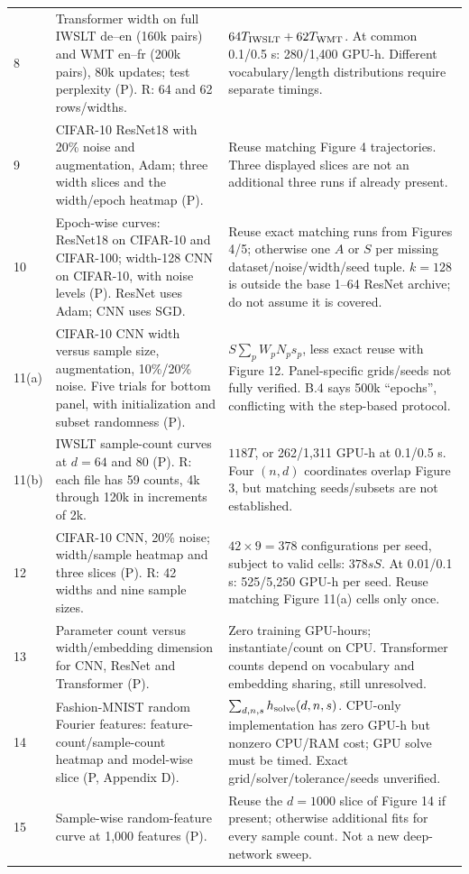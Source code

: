 \documentclass{article}
\begin{document}
\begin{longtable}{@{}P{0.32in}P{3.47in}P{2.9in}@{}}
8 & Transformer width on full IWSLT de--en (160k pairs) and WMT en--fr (200k pairs), 80k updates; test perplexity (P). R: 64 and 62 rows/widths. & $64T_{\rm IWSLT}+62T_{\rm WMT}$. At common 0.1/0.5 s: 280/1,400 GPU-h. Different vocabulary/length distributions require separate timings.\\
9 & CIFAR-10 ResNet18 with 20\% noise and augmentation, Adam; three width slices and the width/epoch heatmap (P). & Reuse matching Figure 4 trajectories. Three displayed slices are not an additional three runs if already present.\\
10 & Epoch-wise curves: ResNet18 on CIFAR-10 and CIFAR-100; width-128 CNN on CIFAR-10, with noise levels (P). ResNet uses Adam; CNN uses SGD. & Reuse exact matching runs from Figures 4/5; otherwise one $A$ or $S$ per missing dataset/noise/width/seed tuple. $k=128$ is outside the base 1--64 ResNet archive; do not assume it is covered.\\
11(a) & CIFAR-10 CNN width versus sample size, augmentation, 10\%/20\% noise. Five trials for bottom panel, with initialization and subset randomness (P). & $S\sum_p W_pN_ps_p$, less exact reuse with Figure 12. Panel-specific grids/seeds not fully verified. B.4 says 500k ``epochs'', conflicting with the step-based protocol.\\
11(b) & IWSLT sample-count curves at $d=64$ and $80$ (P). R: each file has 59 counts, 4k through 120k in increments of 2k. & $118T$, or 262/1,311 GPU-h at 0.1/0.5 s. Four $(n,d)$ coordinates overlap Figure 3, but matching seeds/subsets are not established.\\
12 & CIFAR-10 CNN, 20\% noise; width/sample heatmap and three slices (P). R: 42 widths and nine sample sizes. & $42\times9=378$ configurations per seed, subject to valid cells: $378sS$. At 0.01/0.1 s: 525/5,250 GPU-h per seed. Reuse matching Figure 11(a) cells only once.\\
13 & Parameter count versus width/embedding dimension for CNN, ResNet and Transformer (P). & Zero training GPU-hours; instantiate/count on CPU. Transformer counts depend on vocabulary and embedding sharing, still unresolved.\\
14 & Fashion-MNIST random Fourier features: feature-count/sample-count heatmap and model-wise slice (P, Appendix D). & $\sum_{d,n,s}h_{\rm solve}(d,n,s)$. CPU-only implementation has zero GPU-h but nonzero CPU/RAM cost; GPU solve must be timed. Exact grid/solver/tolerance/seeds unverified.\\
15 & Sample-wise random-feature curve at 1,000 features (P). & Reuse the $d=1000$ slice of Figure 14 if present; otherwise additional fits for every sample count. Not a new deep-network sweep.\\

\end{longtable}
\end{document}
